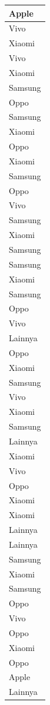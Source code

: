 \documentclass[
  letterpaper,
  DIV=11,
  numbers=noendperiod]{scrartcl}
\begin{document}
\begin{table}
\begin{tabular}[t]{l}
\hline
Apple\\
\hline
Vivo\\
\hline
Xiaomi\\
\hline
Vivo\\
\hline
Xiaomi\\
\hline
Samsung\\
\hline
Oppo\\
\hline
Samsung\\
\hline
Xiaomi\\
\hline
Oppo\\
\hline
Xiaomi\\
\hline
Samsung\\
\hline
Oppo\\
\hline
Vivo\\
\hline
Samsung\\
\hline
Xiaomi\\
\hline
Samsung\\
\hline
Samsung\\
\hline
Xiaomi\\
\hline
Samsung\\
\hline
Oppo\\
\hline
Vivo\\
\hline
Lainnya\\
\hline
Oppo\\
\hline
Xiaomi\\
\hline
Samsung\\
\hline
Vivo\\
\hline
Xiaomi\\
\hline
Samsung\\
\hline
Lainnya\\
\hline
Xiaomi\\
\hline
Vivo\\
\hline
Oppo\\
\hline
Xiaomi\\
\hline
Xiaomi\\
\hline
Lainnya\\
\hline
Lainnya\\
\hline
Samsung\\
\hline
Xiaomi\\
\hline
Samsung\\
\hline
Oppo\\
\hline
Vivo\\
\hline
Oppo\\
\hline
Xiaomi\\
\hline
Oppo\\
\hline
Apple\\
\hline
Lainnya\\

\end{tabular}
\end{table}
\end{document}

